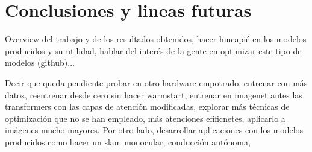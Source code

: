 \section{Conclusiones y lineas futuras}
Overview del trabajo y de los resultados obtenidos, hacer hincapié en los modelos producidos y su utilidad, hablar del interés de la gente en optimizar este tipo de modelos (github)...


Decir que queda pendiente probar en otro hardware empotrado, entrenar con más datos, reentrenar desde cero sin hacer warmstart, entrenar en imagenet antes las transformers con las capas de atención modificadas, explorar más técnicas de optimización que no se han empleado, más atenciones efificnetes, aplicarlo a imágenes mucho mayores. Por otro lado, desarrollar aplicaciones con los modelos producidos como hacer un slam monocular, conducción autónoma, 


